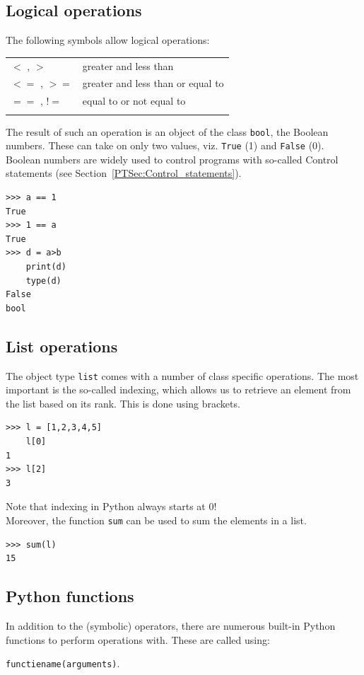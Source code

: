 \subsection{Logical operations}
The following symbols allow logical operations:

\begin{tabular}{>{\hfill}p{5cm}p{12cm}}
	$<$ , $>$	&  greater and less than	\\
	$<=$ , $>=$	&  greater and less than or equal to	\\
	$==$ , $!=$	&  equal to or not equal to	\\
	\multicolumn{2}{l}{} 
\end{tabular}

The result of such an operation is an object of the class \lstinline|bool|, the Boolean numbers. These can take on only two values, viz. \lstinline|True| (1) and \lstinline|False| (0). Boolean numbers are widely used to control programs with so-called Control statements (see Section~\ref{PTSec:Control_statements}).

\begin{lstlisting}[]
>>> a == 1
True
>>> 1 == a
True  
>>> d = a>b
    print(d)
    type(d)
False
bool
\end{lstlisting}

\subsection{List operations}
The object type \lstinline|list| comes with a number of class specific operations. The most important is the so-called indexing, which allows us to retrieve an element from the list based on its rank. This is done using brackets.

\begin{lstlisting}[]
>>> l = [1,2,3,4,5]
    l[0]
1
>>> l[2]
3  

\end{lstlisting}

Note that indexing in Python always starts at 0! \\

Moreover, the function \lstinline|sum| can be used to sum the elements in a list.

\begin{lstlisting}[]
>>> sum(l)
15
\end{lstlisting}

\subsection{Python functions}
In addition to the (symbolic) operators, there are numerous built-in Python functions to perform operations with. These are called using:
\begin{center}
	\lstinline|functiename(arguments)|.
\end{center}

